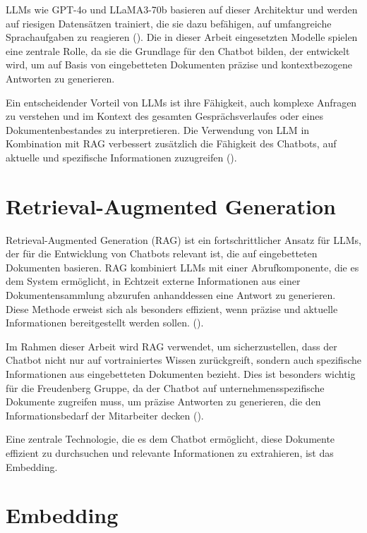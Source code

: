 \acp{LLM} wie GPT-4o und LLaMA3-70b basieren auf dieser Architektur und werden auf riesigen Datensätzen trainiert, die sie dazu befähigen, auf umfangreiche Sprachaufgaben zu reagieren (\cite[S. 782 f.]{Nowak2024}). 
Die in dieser Arbeit eingesetzten Modelle spielen eine zentrale Rolle, da sie die Grundlage für den Chatbot bilden, der entwickelt wird, um auf Basis von eingebetteten Dokumenten präzise und kontextbezogene Antworten zu generieren.

Ein entscheidender Vorteil von \acp{LLM} ist ihre Fähigkeit, auch komplexe Anfragen zu verstehen und im Kontext des gesamten Gesprächsverlaufes oder eines Dokumentenbestandes zu interpretieren. 
Die Verwendung von \ac{LLM} in Kombination mit \ac{RAG} verbessert zusätzlich die Fähigkeit des Chatbots, auf aktuelle und spezifische Informationen zuzugreifen (\cite[S. 1]{chen2023}). 

\section{Retrieval-Augmented Generation}

Retrieval-Augmented Generation (\ac{RAG}) ist ein fortschrittlicher Ansatz für \acp{LLM}, der für die Entwicklung von Chatbots relevant ist, die auf eingebetteten Dokumenten basieren. 
\ac{RAG} kombiniert \acp{LLM} mit einer Abrufkomponente, die es dem System ermöglicht, in Echtzeit externe Informationen aus einer Dokumentensammlung abzurufen anhanddessen eine Antwort zu generieren. 
Diese Methode erweist sich als besonders effizient, wenn präzise und aktuelle Informationen bereitgestellt werden sollen. (\cite[S. 1 ff.]{akkiraju2024factsbuildingretrievalaugmented}).

Im Rahmen dieser Arbeit wird \ac{RAG} verwendet, um sicherzustellen, dass der Chatbot nicht nur auf vortrainiertes Wissen zurückgreift, sondern auch spezifische Informationen aus eingebetteten Dokumenten bezieht. 
Dies ist besonders wichtig für die Freudenberg Gruppe, da der Chatbot auf unternehmensspezifische Dokumente zugreifen muss, um präzise Antworten zu generieren, die den Informationsbedarf der Mitarbeiter decken (\cite[S. 2]{akkiraju2024factsbuildingretrievalaugmented}).

Eine zentrale Technologie, die es dem Chatbot ermöglicht, diese Dokumente effizient zu durchsuchen und relevante Informationen zu extrahieren, ist das Embedding. 

\section{Embedding}


